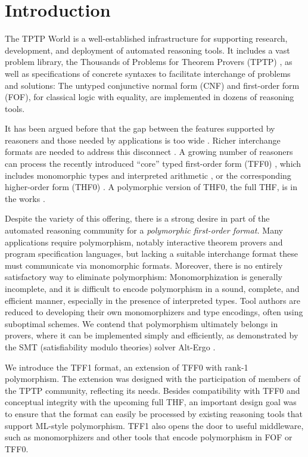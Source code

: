\section{Introduction}
\label{sec_intro}

The TPTP World \cite{sutcliffe-2010-world} is a well-established infrastructure
for supporting research, development, and deployment of automated reasoning
tools. It includes a vast problem library, the Thousands of Problems for Theorem
Provers (TPTP) \cite{sutcliffe-2009-lib}, as well as specifications of concrete
syntaxes to facilitate interchange of problems and solutions: The untyped
conjunctive normal form (CNF) and first-order form (FOF), for classical logic with
equality, are implemented in dozens of reasoning tools.

It has been argued before that the gap between the features supported by
reasoners and those needed by applications is too wide
\cite{stickel-2009,voronkov-2003}. Richer interchange formats are needed to
address this disconnect
\cite{kuncak-2011}. A growing number of reasoners can process the
recently introduced ``core'' typed first-order form (TFF0) \cite{sutcliffe-et-al-2012-tff0},
which includes monomorphic types and interpreted arithmetic \cite{SPASS-T,vampire-arith},
or the corresponding higher-order form (THF0) \cite{benzmueller-et-al-2008-thf0}.
A polymorphic version of THF0, the full THF, is in the works
\cite{sutcliffe-benzmueller-2010}.

Despite the variety of this offering, there is a strong desire in part of the automated
reasoning community for a \emph{polymorphic first-order format.} Many applications
require polymorphism, notably interactive theorem provers and program
specification languages, but lacking a suitable interchange format these
must communicate via monomorphic formats. Moreover, there is no entirely
satisfactory way to eliminate polymorphism: Monomorphization is generally
incomplete, and it is difficult to encode polymorphism in a sound, complete, and
efficient manner, especially in the presence of interpreted types. Tool authors
are reduced to developing their own monomorphizers and type encodings, often
using suboptimal schemes. We contend that polymorphism ultimately belongs in
provers, where it can be implemented simply and efficiently, as demonstrated by
the SMT (satisfiability modulo theories) solver Alt-Ergo \cite{bobot-et-al-2008}.

We introduce the TFF1
format, an extension of TFF0 with rank-1 polymorphism. The
extension was designed with the participation of members of the TPTP community,
reflecting its needs.
Besides compatibility with TFF0 and conceptual integrity with the upcoming full
THF, an important design goal was to ensure that the format can easily be
processed by existing reasoning tools that support ML-style polymorphism. TFF1
also opens the door to useful middleware, such as monomorphizers and other
tools that encode polymorphism in FOF or TFF0.

